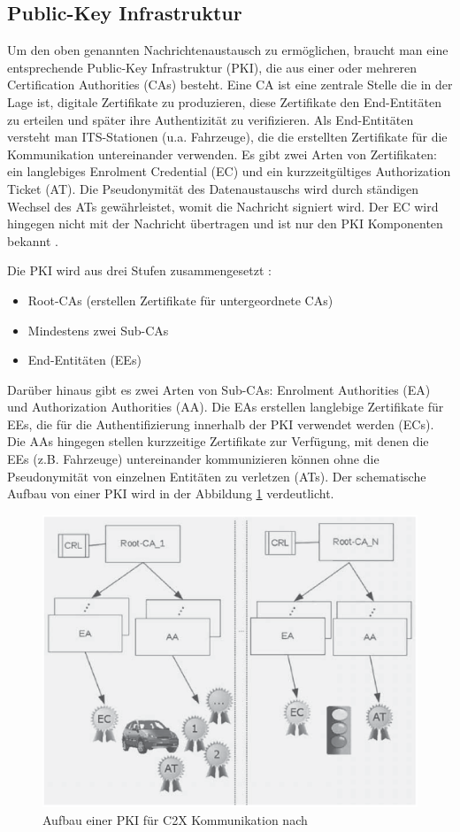 \subsection{Public-Key Infrastruktur}
\label{sec:FirstContentSection:FirstSubSection}
 
Um den oben genannten Nachrichtenaustausch zu ermöglichen, braucht man eine entsprechende Public-Key Infrastruktur (PKI), die aus einer oder mehreren Certification Authorities (CAs) besteht. Eine CA ist eine zentrale Stelle die in der Lage ist, digitale Zertifikate zu produzieren, diese Zertifikate den End-Entitäten zu erteilen und später ihre Authentizität zu verifizieren. Als End-Entitäten versteht man ITS-Stationen (u.a. Fahrzeuge), die die erstellten Zertifikate für die Kommunikation untereinander verwenden. Es gibt zwei Arten von Zertifikaten: ein langlebiges Enrolment Credential (EC) und ein kurzzeitgültiges Authorization Ticket (AT). Die Pseudonymität des Datenaustauschs wird durch ständigen Wechsel des ATs gewährleistet, womit die Nachricht signiert wird. Der EC wird hingegen nicht mit der Nachricht übertragen und ist nur den PKI Komponenten bekannt \cite{Strubbe2017}. 

Die PKI wird aus drei Stufen zusammengesetzt \cite{SecurityCITS}: 
\begin{itemize}
	\item Root-CAs (erstellen Zertifikate für untergeordnete CAs)
	\item Mindestens zwei Sub-CAs
	\item End-Entitäten (EEs)
\end{itemize}

Darüber hinaus gibt es zwei Arten von Sub-CAs: Enrolment Authorities (EA) und Authorization Authorities (AA). Die EAs erstellen langlebige Zertifikate für EEs, die für die Authentifizierung innerhalb der PKI verwendet werden (ECs). Die AAs hingegen stellen kurzzeitige Zertifikate zur Verfügung, mit denen die EEs (z.B. Fahrzeuge) untereinander kommunizieren können ohne die Pseudonymität von einzelnen Entitäten zu verletzen (ATs). Der schematische Aufbau von einer PKI wird in der Abbildung \ref{fig:pki} verdeutlicht.

\begin{figure}
	\centering
	\includegraphics[width=0.7\linewidth]{images/PKI}
	\caption{Aufbau einer PKI für C2X Kommunikation nach \cite{Strubbe2017}}
	\label{fig:pki}
\end{figure}

